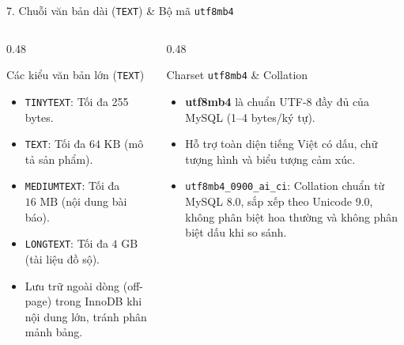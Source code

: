 \documentclass[aspectratio=169,11pt]{beamer}
\newcommand{\kw}[1]{\textcolor{dbblue}{\textbf{#1}}}
\begin{document}
\begin{frame}{7. Chuỗi văn bản dài (\texttt{TEXT}) \& Bộ mã \texttt{utf8mb4}}
\begin{columns}[t]
  \begin{column}{0.48\textwidth}
    \begin{block}{Các kiểu văn bản lớn (\texttt{TEXT})}
      \begin{itemize}\setlength{\itemsep}{1.5pt}
        \item \texttt{TINYTEXT}: Tối đa 255 bytes.
        \item \texttt{TEXT}: Tối đa $64\text{ KB}$ (mô tả sản phẩm).
        \item \texttt{MEDIUMTEXT}: Tối đa $16\text{ MB}$ (nội dung bài báo).
        \item \texttt{LONGTEXT}: Tối đa $4\text{ GB}$ (tài liệu đồ sộ).
        \item Lưu trữ ngoài dòng (off-page) trong InnoDB khi nội dung lớn, tránh phân mảnh bảng.
      \end{itemize}
    \end{block}
  \end{column}
  \begin{column}{0.48\textwidth}
    \begin{block}{Charset \texttt{utf8mb4} \& Collation}
      \begin{itemize}\setlength{\itemsep}{1.5pt}
        \item \kw{utf8mb4} là chuẩn UTF-8 đầy đủ của MySQL (1--4 bytes/ký tự).
        \item Hỗ trợ toàn diện tiếng Việt có dấu, chữ tượng hình và biểu tượng cảm xúc.
        \item \texttt{utf8mb4\_0900\_ai\_ci}: Collation chuẩn từ MySQL 8.0, sắp xếp theo Unicode 9.0, không phân biệt hoa thường và không phân biệt dấu khi so sánh.
      \end{itemize}
    \end{block}
  \end{column}
\end{columns}
\end{frame}

\end{document}

